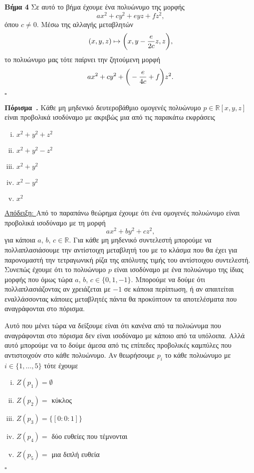 \documentclass[12pt, a4paper]{book}
\newcounter{collorary}[section]
\newenvironment{collorary}[1][]{\refstepcounter{collorary}\par\medskip
   \textbf{Πόρισμα~\thecollorary. #1} \rmfamily}{\medskip}
\begin{document}
\textbf{Βήμα 4} Σε αυτό το βήμα έχουμε ένα πολυώνυμο της μορφής
\begin{displaymath}
ax^2+cy^2+eyz+fz^2,
\end{displaymath}
όπου $c \neq 0$. Μέσω της αλλαγής μεταβλητών
\begin{displaymath}
(x,y,z) \mapsto \bigg{(}x,y-\frac{e}{2c}z,z\bigg{)},
\end{displaymath}
το πολυώνυμο μας τότε παίρνει την ζητούμενη μορφή
\begin{displaymath}
ax^2+cy^2+\bigg{(}-\frac{e}{4c}+f\bigg{)}z^2.
\end{displaymath}
  \begin{flushright}
  $\square$
  \end{flushright}
  
\begin{collorary}
Κάθε μη μηδενικό δευτεροβάθμιο ομογενές πολυώνυμο $p \in \mathbb{R}[x,y,z]$ είναι προβολικά ισοδύναμο με ακριβώς μια από τις παρακάτω εκφράσεις
\begin{enumerate}[(i)]
\item $x^2+y^2+z^2$
\item $x^2+y^2-z^2$
\item $x^2+y^2$
\item $x^2-y^2$
\item $x^2$
\end{enumerate}
\end{collorary}

\underline{Απόδειξη: } Από το παραπάνω θεώρημα έχουμε ότι ένα ομογενές πολυώνυμο είναι προβολικά ισοδύναμο με τη μορφή
\begin{displaymath}
ax^2+by^2+cz^2,
\end{displaymath}
για κάποια $a$, $b$, $c \in \mathbb{R}$. Για κάθε μη μηδενικό συντελεστή μπορούμε να πολλαπλασιάσουμε την αντίστοιχη μεταβλητή του με το κλάσμα που θα έχει για παρονομαστή την τετραγωνική ρίζα της απόλυτης τιμής του αντίστοιχου συντελεστή. Συνεπώς έχουμε ότι το πολυώνυμο $p$ είναι ισοδύναμο με ένα πολυώνυμο της ίδιας μορφής που όμως τώρα $a$, $b$, $c \in \{0,1,-1\}$. Μπορούμε να δούμε ότι πολλαπλασιάζοντας αν χρειάζεται με $-1$ σε κάποια περίπτωση, ή αν απαιτείται εναλλάσσοντας κάποιες μεταβλητές πάντα θα προκύπτουν τα αποτελέσματα που αναγράφονται στο πόρισμα.

Αυτό που μένει τώρα να δείξουμε είναι ότι κανένα από τα πολυώνυμα που αναγράφονται στο πόρισμα δεν είναι ισοδύναμο με κάποιο από τα υπόλοιπα. Αλλά αυτό μπορούμε να το δούμε άμεσα από τις επίπεδες προβολικές καμπύλες που αντιστοιχούν στο κάθε πολυώνυμο. Αν θεωρήσουμε $p_i$ το κάθε πολυώνυμο με $i \in \{1,…,5\}$ τότε έχουμε
\begin{enumerate}[(i)]
\item $Z(p_1) = \emptyset$
\item $Z(p_2) =$ κύκλος
\item $Ζ(p_3) = \{[0:0:1]\}$
\item $Z(p_4) =$ δύο ευθείες που τέμνονται
\item $Z(p_5) =$ μια διπλή ευθεία
\end{enumerate}
  \begin{flushright}
  $\square$
  \end{flushright}
  
\end{document}
